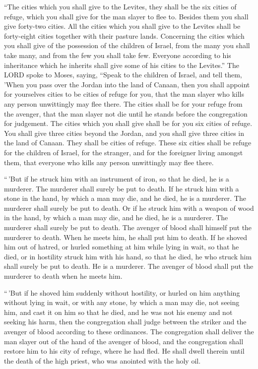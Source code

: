  ``The cities which you shall give to the Levites, they
shall be the six cities of refuge, which you shall give for the man
slayer to flee to. Besides them you shall give forty-two cities.
 All the cities which you shall give to the Levites shall
be forty-eight cities together with their pasture lands. 
Concerning the cities which you shall give of the possession of the
children of Israel, from the many you shall take many, and from the few
you shall take few. Everyone according to his inheritance which he
inherits shall give some of his cities to the Levites.'' 
The LORD spoke to Moses, saying,  ``Speak to the children
of Israel, and tell them, 'When you pass over the Jordan into the land
of Canaan,  then you shall appoint for yourselves cities
to be cities of refuge for you, that the man slayer who kills any person
unwittingly may flee there.  The cities shall be for your
refuge from the avenger, that the man slayer not die until he stands
before the congregation for judgement.  The cities which
you shall give shall be for you six cities of refuge. 
You shall give three cities beyond the Jordan, and you shall give three
cities in the land of Canaan. They shall be cities of refuge.
 These six cities shall be refuge for the children of
Israel, for the stranger, and for the foreigner living amongst them,
that everyone who kills any person unwittingly may flee there.

 ``\,'But if he struck him with an instrument of iron, so
that he died, he is a murderer. The murderer shall surely be put to
death.  If he struck him with a stone in the hand, by
which a man may die, and he died, he is a murderer. The murderer shall
surely be put to death.  Or if he struck him with a
weapon of wood in the hand, by which a man may die, and he died, he is a
murderer. The murderer shall surely be put to death.  The
avenger of blood shall himself put the murderer to death. When he meets
him, he shall put him to death.  If he shoved him out of
hatred, or hurled something at him while lying in wait, so that he died,
 or in hostility struck him with his hand, so that he
died, he who struck him shall surely be put to death. He is a murderer.
The avenger of blood shall put the murderer to death when he meets him.

 ``\,'But if he shoved him suddenly without hostility, or
hurled on him anything without lying in wait,  or with
any stone, by which a man may die, not seeing him, and cast it on him so
that he died, and he was not his enemy and not seeking his harm,
 then the congregation shall judge between the striker
and the avenger of blood according to these ordinances. 
The congregation shall deliver the man slayer out of the hand of the
avenger of blood, and the congregation shall restore him to his city of
refuge, where he had fled. He shall dwell therein until the death of the
high priest, who was anointed with the holy oil.

